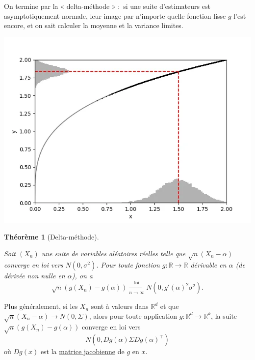 \documentclass[
  10,
  letterpaper,
  DIV=11,
  numbers=noendperiod]{scrreport}
\theoremstyle{plain}
\newtheorem{theorem}{Théorème}[chapter]
\theoremstyle{definition}
\theoremstyle{plain}
\theoremstyle{definition}
\theoremstyle{definition}
\theoremstyle{plain}
\theoremstyle{remark}
\begin{document}
On termine par la « delta-méthode » :~si une suite d'estimateurs est
asymptotiquement normale, leur image par n'importe quelle fonction lisse
\(g\) l'est encore, et on sait calculer la moyenne et la variance
limites.

\includegraphics{images/histogram.webp}

\begin{theorem}[Delta-méthode]\protect\hypertarget{thm-deltamethod}{}\label{thm-deltamethod}

Soit \((X_n)\) une suite de variables aléatoires réelles telle que
\(\sqrt{n}(X_n - \alpha)\) converge en loi vers \(N(0,\sigma^2)\). Pour
toute fonction \(g : \mathbb{R} \to \mathbb{R}\) dérivable en \(\alpha\)
(de dérivée non nulle en \(\alpha\)), on a
\[ \sqrt{n}(g(X_n) - g(\alpha)) \xrightarrow[n \to \infty]{\text{loi}} N(0, g'(\alpha)^2 \sigma^2).\]

\end{theorem}

Plus généralement, si les \(X_n\) sont à valeurs dans \(\mathbb{R}^d\)
et que \(\sqrt{n}(X_n - \alpha) \to N(0,\Sigma)\), alors pour toute
application \(g:\mathbb{R}^d \to \mathbb{R}^k\), la suite
\(\sqrt{n}(g(X_n) - g(\alpha))\) converge en loi vers
\[N(0, Dg(\alpha)\Sigma Dg(\alpha)^\top)\] où \(Dg(x)\) est la
\href{https://fr.wikipedia.org/wiki/Matrice_jacobienne}{matrice
jacobienne} de \(g\) en \(x\).
\end{document}
